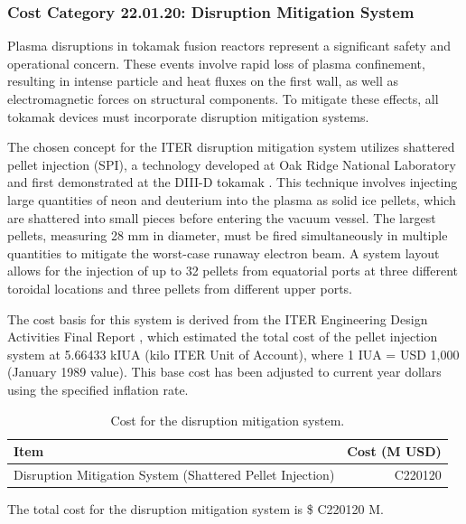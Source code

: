 \ifsafetycosts
\subsubsection*{Cost Category 22.01.20: Disruption Mitigation System}

Plasma disruptions in tokamak fusion reactors represent a significant safety and operational concern. These events involve rapid loss of plasma confinement, resulting in intense particle and heat fluxes on the first wall, as well as electromagnetic forces on structural components. To mitigate these effects, all tokamak devices must incorporate disruption mitigation systems.

The chosen concept for the ITER disruption mitigation system utilizes shattered pellet injection (SPI), a technology developed at Oak Ridge National Laboratory and first demonstrated at the DIII-D tokamak \cite{baylor2019shattered}. This technique involves injecting large quantities of neon and deuterium into the plasma as solid ice pellets, which are shattered into small pieces before entering the vacuum vessel. The largest pellets, measuring 28 mm in diameter, must be fired simultaneously in multiple quantities to mitigate the worst-case runaway electron beam. A system layout allows for the injection of up to 32 pellets from equatorial ports at three different toroidal locations and three pellets from different upper ports.

The cost basis for this system is derived from the ITER Engineering Design Activities Final Report \cite{iter2001final}, which estimated the total cost of the pellet injection system at 5.66433 kIUA (kilo ITER Unit of Account), where 1 IUA = USD 1,000 (January 1989 value). This base cost has been adjusted to current year dollars using the specified inflation rate.

\begin{table}[ht]
    \centering
    \begin{tabular}{lr}
        \hline
        \textbf{Item} & \textbf{Cost (M USD)} \\ \hline
        Disruption Mitigation System (Shattered Pellet Injection) & C220120 \\ \hline
    \end{tabular}
    \caption{Cost for the disruption mitigation system.}
    \label{tab:cas220120-cost}
\end{table}

The total cost for the disruption mitigation system is \$ C220120 M.
\fi